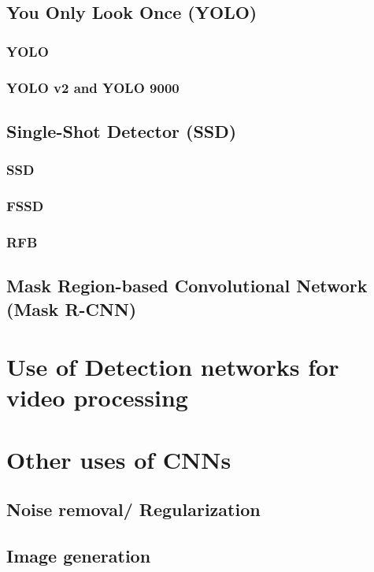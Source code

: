 \subsection{You Only Look Once (YOLO)}
\subsubsection{YOLO}
\subsubsection{YOLO v2 and YOLO 9000}

\subsection{Single-Shot Detector (SSD)}
\subsubsection{SSD}
\subsubsection{FSSD}
\subsubsection{RFB}

\subsection{Mask Region-based Convolutional Network (Mask R-CNN)}

\section{Use of Detection networks for video processing}

\section{Other uses of CNNs}
\subsection{Noise removal/ Regularization}
\subsection{Image generation}



